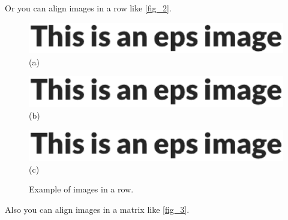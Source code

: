 \documentclass{article}
\begin{document}
    Or you can align images in a row like \autoref{fig_2}.

    \begin{figure}[htb]
        \centering
        \begin{minipage}[t]{0.33\linewidth}
            \centering
            \includegraphics[width=\linewidth]{example.eps}
            (a)
        \end{minipage}
        \begin{minipage}[t]{0.33\linewidth}
            \centering
            \includegraphics[width=\linewidth]{example.eps}
            (b)
        \end{minipage}
        \begin{minipage}[t]{0.33\linewidth}
            \centering
            \includegraphics[width=\linewidth]{example.eps}
            (c)
        \end{minipage}
   
        \caption{Example of images in a row.}
        \label{fig_2}
    \end{figure}

    Also you can align images in a matrix like \autoref{fig_3}.
\end{document}
